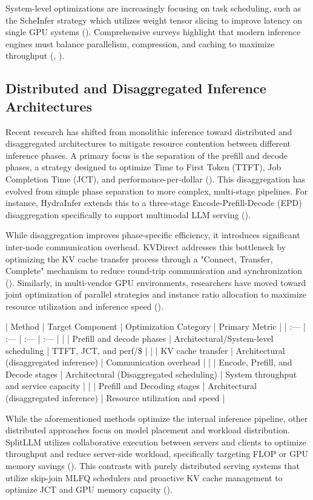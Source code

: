 \documentclass[11pt]{article}
\begin{document}
System-level optimizations are increasingly focusing on task scheduling, such as the ScheInfer strategy which utilizes weight tensor slicing to improve latency on single GPU systems (\citep{2411.15715}). Comprehensive surveys highlight that modern inference engines must balance parallelism, compression, and caching to maximize throughput (\citep{2505.01658}, \citep{2506.21901}).
\subsection{Distributed and Disaggregated Inference Architectures}

Recent research has shifted from monolithic inference toward distributed and disaggregated architectures to mitigate resource contention between different inference phases. A primary focus is the separation of the prefill and decode phases, a strategy designed to optimize Time to First Token (TTFT), Job Completion Time (JCT), and performance-per-dollar (\citep{2401.11181}). This disaggregation has evolved from simple phase separation to more complex, multi-stage pipelines. For instance, HydraInfer extends this to a three-stage Encode-Prefill-Decode (EPD) disaggregation specifically to support multimodal LLM serving (\citep{2505.12658}).

While disaggregation improves phase-specific efficiency, it introduces significant inter-node communication overhead. KVDirect addresses this bottleneck by optimizing the KV cache transfer process through a "Connect, Transfer, Complete" mechanism to reduce round-trip communication and synchronization (\citep{2501.14743}). Similarly, in multi-vendor GPU environments, researchers have moved toward joint optimization of parallel strategies and instance ratio allocation to maximize resource utilization and inference speed (\citep{2509.17542}).

| Method | Target Component | Optimization Category | Primary Metric |
| :--- | :--- | :--- | :--- |
| \citep{2401.11181} | Prefill and decode phases | Architectural/System-level scheduling | TTFT, JCT, and perf/\$ |
| \citep{2501.14743} | KV cache transfer | Architectural (disaggregated inference) | Communication overhead |
| \citep{2505.12658} | Encode, Prefill, and Decode stages | Architectural (Disaggregated scheduling) | System throughput and service capacity |
| \citep{2509.17542} | Prefill and Decoding stages | Architectural (disaggregated inference) | Resource utilization and speed |

While the aforementioned methods optimize the internal inference pipeline, other distributed approaches focus on model placement and workload distribution. SplitLLM utilizes collaborative execution between servers and clients to optimize throughput and reduce server-side workload, specifically targeting FLOP or GPU memory savings (\citep{2410.10759}). This contrasts with purely distributed serving systems that utilize skip-join MLFQ schedulers and proactive KV cache management to optimize JCT and GPU memory capacity (\citep{2305.05920}).
\end{document}
